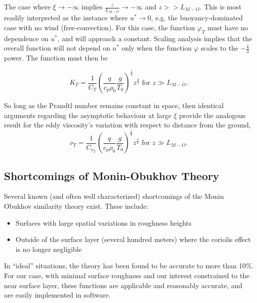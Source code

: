 The case where $\xi \to -\infty $ implies $\frac{z}{L_{M-O}} \to
-\infty $ and $z>>L_{M-O}$. This is most readily interpreted as the instance
where $u^* \to 0$, e.g. the buoyancy-dominated case with no wind
(free-convection). For this case, the function $\varphi_T$ must have no
dependence on $u^*$, and will approach a constant. Scaling
analysis implies that the overall function will not depend on $u^*$ only
when the function $\varphi$ scales to the $-\frac{4}{3}$ power. The
function must then be

\begin{equation}
 K_T = \frac{1}{C_T} \left( \frac{q}{c_p \rho_0} \frac{g}{T_0}
		     \right)^\frac{1}{3} z^{\frac{4}{3}}  \text{ 
for } z \gg L_{M-O}. 
\end{equation}

So long as the Prandtl number remains constant in space, then 
identical arguments regarding the asymptotic behaviour at large $\xi$ provide
the analogous result for the eddy viscosity's variation with respect to
distance from the ground,  
\begin{equation}
 \nu_T = \frac{1}{C_{\nu_T}} \left( \frac{q}{c_p \rho_0} \frac{g}{T_0}
			     \right)^\frac{1}{3} z^{\frac{4}{3}}  \text{ 
for } z \gg L_{M-O}. 
\end{equation}

\subsection{Shortcomings of Monin-Obukhov Theory}

Several known (and often well characterized) shortcomings of the Monin
Obukhov similarity theory exist. These include:

\begin{itemize}
 \item Surfaces with large spatial variations in roughness heights
 \item Outside of the surface layer (several hundred meters) where the 
       coriolis effect is no longer negligible
\end{itemize}

In ``ideal'' situations, the theory has been found to be
accurate to more than 10\%\cite{QJ:QJ49709741204,kaimal}. 
For our case, with minimal surface roughness and our interest
constrained to the near surface layer, these functions are applicable
and reasonably accurate\cite{Foken2006}, and are easily implemented in
software.  

